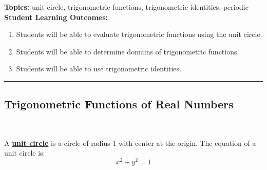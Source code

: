 

\noindent \textbf{Topics:}  unit circle, trigonometric functions, trigonometric identities, periodic\\

\noindent \textbf{Student Learning Outcomes:}
\begin{enumerate}
\item Students will be able to evaluate trigonometric functions using the unit circle.
\item Students will be able to determine domains of trigonometric functions.
\item Students will be able to use trigonometric identities.
\end{enumerate}

\hrule 

\bigskip

\subsection{Trigonometric Functions of Real Numbers} ~

\noindent
A \textbf{\underline{unit circle}} is a circle of radius 1 with center
at the origin.  The equation of a unit circle is:
$$x^2+y^2=1$$

